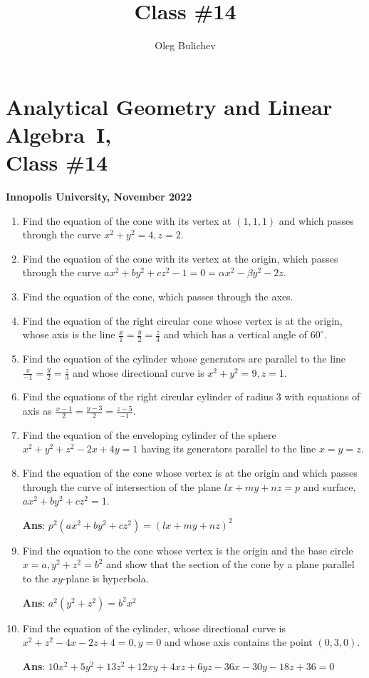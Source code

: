 \documentclass[a4paper,10pt]{article}
\title{Class \#14}
\author{Oleg Bulichev}
\date{}
\begin{document}
\section*{Analytical Geometry and Linear Algebra~I, \\ Class \#14}
\noindent\textbf{Innopolis University, November 2022}
\\

\begin{enumerate}

  \item Find the equation of the cone with its vertex at $(1,1,1)$ and which passes through the curve $x^2+y^2=4, z =2$.

  \item Find the equation of the cone with its vertex at the origin, which passes through the curve $ax^2+by^2+cz^2-1=0= \alpha x^2 - \beta y^2 - 2z$.
  
  \item Find the equation of the cone, which passes through the axes.
  
  \item Find the equation of the right circular cone whose vertex is at the origin, whose axis is the line $\frac{x}{1}=\frac{y}{2}=\frac{z}{3}$ and which has a vertical angle of $60^\circ$.
  
  \item Find the equation of the cylinder whose generators are parallel to the line $\frac{x}{-1}=\frac{y}{2}=\frac{z}{3}$ and whose directional curve is $x^2+y^2=9, z=1$.
  
  \item Find the equations of the right circular cylinder of radius $3$ with equations of axis as  $\frac{x-1}{2}=\frac{y-3}{2}=\frac{z-5}{-1}$.
  
  \item Find the equation of the enveloping cylinder of the sphere $x^2+y^2+z^2-2x+4y=1$ having its generators parallel to the line $x=y=z$.
  
  \item   Find the equation of the cone whose vertex is at the origin and which passes through the curve of intersection of the plane $lx+my+nz=p$ and surface, $ax^2+by^2+cz^2=1$.

\textbf{Ans}: $p^2(ax^2+by^2+cz^2)=(lx+my+nz)^2$

\item Find the equation to the cone whose vertex is the origin and the base circle $x=a, y^2+z^2=b^2$ and show that the section of the cone by a plane parallel to the $xy$-plane is hyperbola.

\textbf{Ans}: $a^2(y^2+z^2)=b^2x^2$

\item  Find the equation of the cylinder, whose directional curve is $x^2+z^2-4x-2z+4=0, y =0$ and whose axis contains the point $(0,3,0)$. 

\textbf{Ans}: $10x^2+5y^2+13z^2+12xy+4xz+6yz-36x-30y-18z+36=0$ 

\end{enumerate}
\end{document}

